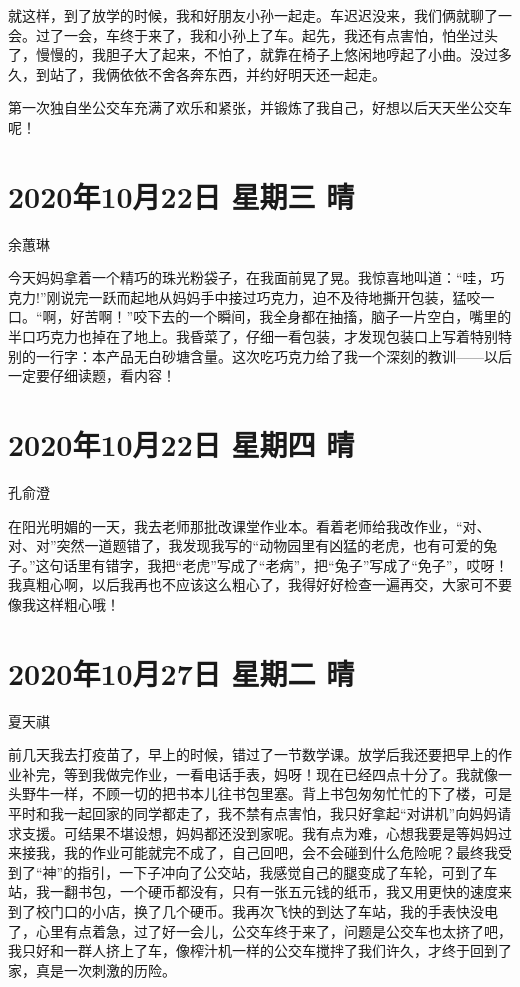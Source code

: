 就这样，到了放学的时候，我和好朋友小孙一起走。车迟迟没来，我们俩就聊了一会。过了一会，车终于来了，我和小孙上了车。起先，我还有点害怕，怕坐过头了，慢慢的，我胆子大了起来，不怕了，就靠在椅子上悠闲地哼起了小曲。没过多久，到站了，我俩依依不舍各奔东西，并约好明天还一起走。

第一次独自坐公交车充满了欢乐和紧张，并锻炼了我自己，好想以后天天坐公交车呢！

\section{2020年10月22日 星期三 晴}

余蕙琳

今天妈妈拿着一个精巧的珠光粉袋子，在我面前晃了晃。我惊喜地叫道：“哇，巧克力!”刚说完一跃而起地从妈妈手中接过巧克力，迫不及待地撕开包装，猛咬一口。“啊，好苦啊！”咬下去的一个瞬间，我全身都在抽搐，脑子一片空白，嘴里的半口巧克力也掉在了地上。我昏菜了，仔细一看包装，才发现包装口上写着特别特别的一行字：本产品无白砂塘含量。这次吃巧克力给了我一个深刻的教训——以后一定要仔细读题，看内容！

\section{2020年10月22日 星期四 晴}

孔俞澄

在阳光明媚的一天，我去老师那批改课堂作业本。看着老师给我改作业，“对、对、对”突然一道题错了，我发现我写的“动物园里有凶猛的老虎，也有可爱的兔子。”这句话里有错字，我把“老虎”写成了“老病”，把“兔子”写成了“免子”，哎呀！我真粗心啊，以后我再也不应该这么粗心了，我得好好检查一遍再交，大家可不要像我这样粗心哦！

\section{2020年10月27日 星期二 晴}

夏天祺

前几天我去打疫苗了，早上的时候，错过了一节数学课。放学后我还要把早上的作业补完，等到我做完作业，一看电话手表，妈呀！现在已经四点十分了。我就像一头野牛一样，不顾一切的把书本儿往书包里塞。背上书包匆匆忙忙的下了楼，可是平时和我一起回家的同学都走了，我不禁有点害怕，我只好拿起“对讲机”向妈妈请求支援。可结果不堪设想，妈妈都还没到家呢。我有点为难，心想我要是等妈妈过来接我，我的作业可能就完不成了，自己回吧，会不会碰到什么危险呢？最终我受到了“神”的指引，一下子冲向了公交站，我感觉自己的腿变成了车轮，可到了车站，我一翻书包，一个硬币都没有，只有一张五元钱的纸币，我又用更快的速度来到了校门口的小店，换了几个硬币。我再次飞快的到达了车站，我的手表快没电了，心里有点着急，过了好一会儿，公交车终于来了，问题是公交车也太挤了吧，我只好和一群人挤上了车，像榨汁机一样的公交车搅拌了我们许久，才终于回到了家，真是一次刺激的历险。


